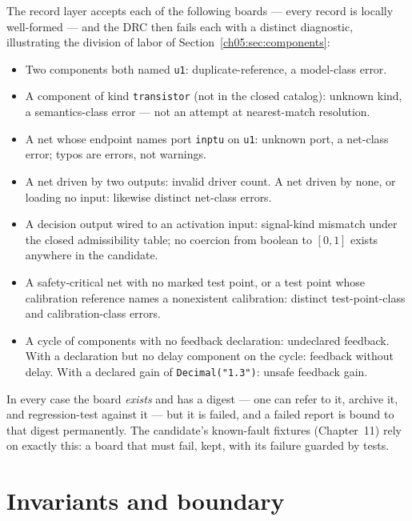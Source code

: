 \begin{example}\label{ch05:ex:drc}
The record layer accepts each of the following boards --- every record is
locally well-formed --- and the DRC then fails each with a distinct
diagnostic, illustrating the division of labor of
Section~\ref{ch05:sec:components}:

\begin{itemize}
\item Two components both named \texttt{u1}: duplicate-reference, a
model-class error.
\item A component of kind \texttt{transistor} (not in the closed
catalog): unknown kind, a semantics-class error --- not an attempt at
nearest-match resolution.
\item A net whose endpoint names port \texttt{inptu} on \texttt{u1}:
unknown port, a net-class error; typos are errors, not warnings.
\item A net driven by two outputs: invalid driver count. A net driven by
none, or loading no input: likewise distinct net-class errors.
\item A decision output wired to an activation input: signal-kind
mismatch under the closed admissibility table; no coercion from boolean
to $[0,1]$ exists anywhere in the candidate.
\item A safety-critical net with no marked test point, or a test point
whose calibration reference names a nonexistent calibration: distinct
test-point-class and calibration-class errors.
\item A cycle of components with no feedback declaration: undeclared
feedback. With a declaration but no delay component on the cycle:
feedback without delay. With a declared gain of \texttt{Decimal("1.3")}:
unsafe feedback gain.
\end{itemize}

In every case the board \emph{exists} and has a digest --- one can refer
to it, archive it, and regression-test against it --- but it is failed,
and a failed report is bound to that digest permanently. The candidate's
known-fault fixtures (Chapter~11) rely on exactly this: a board that
must fail, kept, with its failure guarded by tests.
\end{example}

\section{Invariants and boundary}\label{ch05:sec:invariants}


